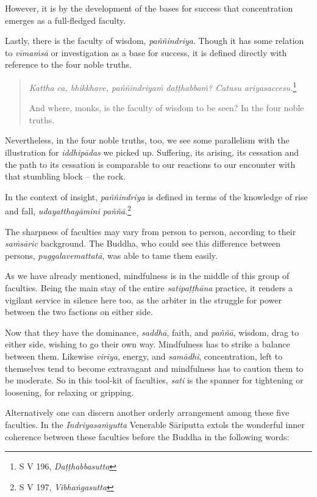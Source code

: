 However, it is by the development of the bases for success that concentration emerges as a full-fledged faculty.

Lastly, there is the faculty of wisdom, \emph{paññindriya}. Though it has some relation to \emph{vīmaṁsā} or investigation as a base for success, it is defined directly with reference to the four noble truths.

\begin{quote}
\emph{Kattha ca, bhikkhave, paññindriyaṁ daṭṭhabbaṁ? Catusu ariyasaccesu.}\footnote{S V 196, \emph{Daṭṭhabbasutta}}

And where, monks, is the faculty of wisdom to be seen? In the four noble truths.
\end{quote}

Nevertheless, in the four noble truths, too, we see some parallelism with the illustration for \emph{iddhipādas} we picked up. Suffering, its arising, its cessation and the path to its cessation is comparable to our reactions to our encounter with that stumbling block -- the rock.

In the context of insight, \emph{paññindriya} is defined in terms of the knowledge of rise and fall, \emph{udayatthagāmini paññā}.\footnote{S V 197, \emph{Vibhaṅgasutta}}

The sharpness of faculties may vary from person to person, according to their \emph{saṁsāric} background. The Buddha, who could see this difference between persons, \emph{puggalavemattatā}, was able to tame them easily.

As we have already mentioned, mindfulness is in the middle of this group of faculties. Being the main stay of the entire \emph{satipaṭṭhāna} practice, it renders a vigilant service in silence here too, as the arbiter in the struggle for power between the two factions on either side.

Now that they have the dominance, \emph{saddhā}, faith, and \emph{paññā}, wisdom, drag to either side, wishing to go their own way. Mindfulness has to strike a balance between them. Likewise \emph{viriya}, energy, and \emph{samādhi}, concentration, left to themselves tend to become extravagant and mindfulness has to caution them to be moderate. So in this tool-kit of faculties, \emph{sati} is the spanner for tightening or loosening, for relaxing or gripping.

Alternatively one can discern another orderly arrangement among these five faculties. In the \emph{Indriyasaṁyutta} Venerable Sāriputta extols the wonderful inner coherence between these faculties before the Buddha in the following words:

